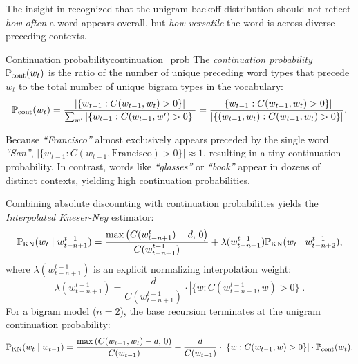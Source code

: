 \documentclass[../../main.tex]{subfiles}
\begin{document}
The insight in \cite{kneser1995} recognized that the unigram backoff distribution should not reflect \emph{how often} a word appears overall, but \emph{how versatile} the word is across diverse preceding contexts.

\begin{definition}{Continuation probability}{continuation_prob}
The \emph{continuation probability} $\mathbb{P}_{\text{cont}}(w_t)$ is the ratio of the number of unique preceding word types that precede $w_t$ to the total number of unique bigram types in the vocabulary:
\begin{equation}
\label{eq:continuation_prob}
\mathbb{P}_{\text{cont}}(w_t) = \frac{|\{ w_{t-1} : C(w_{t-1}, w_t) > 0 \}|}{\sum_{w'} |\{ w_{t-1} : C(w_{t-1}, w') > 0 \}|} = \frac{|\{ w_{t-1} : C(w_{t-1}, w_t) > 0 \}|}{|\{ (w_{t-1}, w_t) : C(w_{t-1}, w_t) > 0 \}|}.
\end{equation}
\end{definition}

Because \textit{``Francisco''} almost exclusively appears preceded by the single word \textit{``San''}, $|\{ w_{t-1} : C(w_{t-1}, \text{Francisco}) > 0 \}| \approx 1$, resulting in a tiny continuation probability. In contrast, words like \textit{``glasses''} or \textit{``book''} appear in dozens of distinct contexts, yielding high continuation probabilities.

Combining absolute discounting with continuation probabilities yields the \emph{Interpolated Kneser-Ney} estimator:
\begin{equation}
\label{eq:kneser_ney}
\mathbb{P}_{\text{KN}}(w_t \mid w_{t-n+1}^{t-1}) = \frac{\max\left( C(w_{t-n+1}^t) - d, \, 0 \right)}{C(w_{t-n+1}^{t-1})} + \lambda(w_{t-n+1}^{t-1}) \mathbb{P}_{\text{KN}}(w_t \mid w_{t-n+2}^{t-1}),
\end{equation}
where $\lambda(w_{t-n+1}^{t-1})$ is an explicit normalizing interpolation weight:
\begin{equation}
\label{eq:kn_lambda}
\lambda(w_{t-n+1}^{t-1}) = \frac{d}{C(w_{t-n+1}^{t-1})} \cdot \left| \{ w : C(w_{t-n+1}^{t-1}, w) > 0 \} \right|.
\end{equation}
For a bigram model ($n=2$), the base recursion terminates at the unigram continuation probability:
\begin{equation}
\label{eq:kn_bigram}
\mathbb{P}_{\text{KN}}(w_t \mid w_{t-1}) = \frac{\max\left( C(w_{t-1}, w_t) - d, \, 0 \right)}{C(w_{t-1})} + \frac{d}{C(w_{t-1})} \cdot \left| \{ w : C(w_{t-1}, w) > 0 \} \right| \cdot \mathbb{P}_{\text{cont}}(w_t).
\end{equation}
\end{document}
